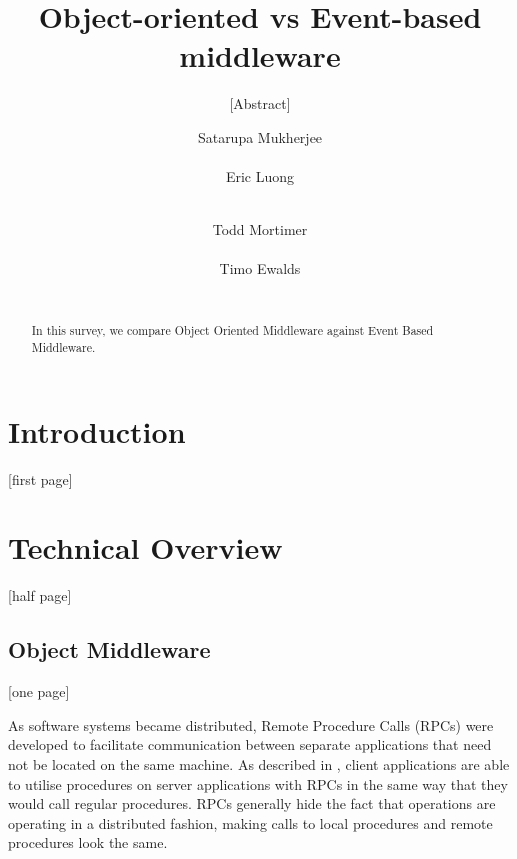 \documentclass{acm_proc_article-sp}
\begin{document}
\title{Object-oriented vs Event-based middleware}
\subtitle{[Abstract]}


\author{
\alignauthor
Satarupa Mukherjee \\
       \\
\alignauthor
Eric Luong \\
       \\
\and  
\alignauthor 
Todd Mortimer \\
       \\
\alignauthor 
Timo Ewalds\\
      \\
}


\maketitle
\begin{abstract}

In this survey, we compare Object Oriented Middleware against Event Based Middleware.

\end{abstract}


\section{Introduction}

[first page]


\section{Technical Overview}

[half page]


\subsection{Object Middleware}

[one page]

As software systems became distributed, Remote Procedure Calls (RPCs) were developed to facilitate communication between separate applications that need not be located on the same machine.  As described in \cite{Vinoski:2004p8371}, client applications are able to utilise procedures on server applications with RPCs in the same way that they would call regular procedures.  RPCs generally hide the fact that operations are operating in a distributed fashion, making calls to local procedures and remote procedures look the same.
\end{document}
